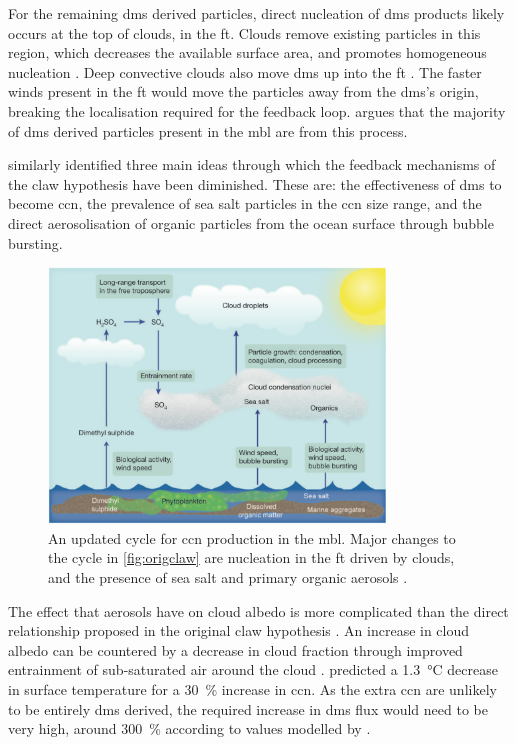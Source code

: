 		For the remaining \gls{dms} derived particles, direct nucleation of \gls{dms} products likely occurs at the top of clouds, in the \gls{ft}. Clouds remove existing particles in this region, which decreases the available surface area, and promotes homogeneous nucleation \citep{perry1994further}. Deep convective clouds also move \gls{dms} up into the \gls{ft} \citep{clarke1998particle}. The faster winds present in the \gls{ft} would move the particles away from the \gls{dms}'s origin, breaking the localisation required for the feedback loop. \citet{quinn:2011iv} argues that the majority of \gls{dms} derived particles present in the \gls{mbl} are from this process.

		\citet{cainey:2007jj} similarly identified three main ideas through which the feedback mechanisms of the \gls{claw} hypothesis have been diminished. These are: the effectiveness of \gls{dms} to become \gls{ccn}, the prevalence of sea salt particles in the \gls{ccn} size range, and the direct aerosolisation of organic particles from the ocean surface through bubble bursting.

		\begin{figure}[!htb]
	 	    \centering
	 	    \includegraphics[width=0.8\textwidth,natwidth=1694,natheight=1284]{Fig/quinncycle.png}
	 	    \caption{An updated cycle for \gls{ccn} production in the \gls{mbl}. Major changes to the cycle in \cref{fig:origclaw} are nucleation in the \gls{ft} driven by clouds, and the presence of sea salt and primary organic aerosols \citep{quinn:2011iv}.}
	 	    \label{fig:quinncyc}
	 	\end{figure}

		The effect that aerosols have on cloud albedo is more complicated than the direct relationship proposed in the original \gls{claw} hypothesis \citep{quinn:2011iv, cainey:2007jj}. An increase in cloud albedo can be countered by a decrease in cloud fraction through improved entrainment of sub-saturated air around the cloud \citep{zuidema2008shortwave}. \citet{charlson:1987fw} predicted a \SI{1.3}{\celsius} decrease in surface temperature for a \SI{30}{\percent} increase in \gls{ccn}. As the extra \gls{ccn} are unlikely to be entirely \gls{dms} derived, the required increase in \gls{dms} flux would need to be very high, around \SI{300}{\percent} according to values modelled by \citet{woodhouse:2010ed}.

